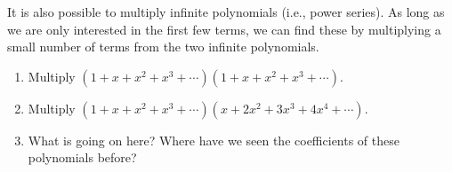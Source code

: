 \documentclass{book}
\begin{document}
\setcounter{project}{235}
\addtocounter{project}{-1}
\begin{activity}[]\label{activity-228}
\hypertarget{p-1315}{}%
It is also possible to multiply infinite polynomials (i.e., power series).  As long as we are only interested in the first few terms, we can find these by multiplying a small number of terms from the two infinite polynomials.%
\begin{enumerate}[font=\bfseries,label=(\alph*),ref=\alph*]
\item\label{task-242} \hypertarget{p-1316}{}%
Multiply \((1+x+x^2+x^3 + \cdots)(1+ x + x^2 + x^3+ \cdots)\).%
\item\label{task-243} \hypertarget{p-1317}{}%
Multiply \((1+x+x^2 + x^3 + \cdots)(x + 2x^2 + 3x^3 + 4x^4 + \cdots)\).%
\item\label{task-244} \hypertarget{p-1318}{}%
What is going on here?  Where have we seen the coefficients of these polynomials before?%
\end{enumerate}
\end{activity}
\end{document}
